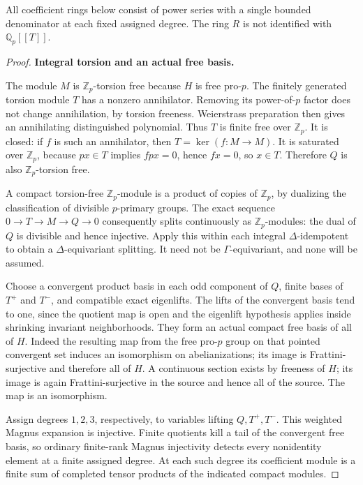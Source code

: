 \documentclass[11pt,a4paper]{article}
\theoremstyle{definition}
\begin{document}
All coefficient rings below consist of power series with a single bounded denominator at each fixed assigned degree. The ring \(R\) is not identified with \(\mathbb Q_p[[T]]\).

\begin{proof}
\par\medskip\noindent\textbf{Integral torsion and an actual free basis.}

The module \(M\) is \(\mathbb Z_p\)-torsion free because \(H\) is free pro-\(p\). The finitely generated torsion module \(T\) has a nonzero annihilator. Removing its power-of-\(p\) factor does not change annihilation, by torsion freeness. Weierstrass preparation then gives an annihilating distinguished polynomial. Thus \(T\) is finite free over \(\mathbb Z_p\). It is closed: if \(f\) is such an annihilator, then \(T=\ker(f:M\to M)\). It is saturated over \(\mathbb Z_p\), because \(p x\in T\) implies \(fpx=0\), hence \(fx=0\), so \(x\in T\). Therefore \(Q\) is also \(\mathbb Z_p\)-torsion free.

A compact torsion-free \(\mathbb Z_p\)-module is a product of copies of \(\mathbb Z_p\), by dualizing the classification of divisible \(p\)-primary groups. The exact sequence \(0\to T\to M\to Q\to0\) consequently splits continuously as \(\mathbb Z_p\)-modules: the dual of \(Q\) is divisible and hence injective. Apply this within each integral \(\Delta\)-idempotent to obtain a \(\Delta\)-equivariant splitting. It need not be \(\Gamma\)-equivariant, and none will be assumed.

Choose a convergent product basis in each odd component of \(Q\), finite bases of \(T^+\) and \(T^-\), and compatible exact eigenlifts. The lifts of the convergent basis tend to one, since the quotient map is open and the eigenlift hypothesis applies inside shrinking invariant neighborhoods. They form an actual compact free basis of all of \(H\). Indeed the resulting map from the free pro-\(p\) group on that pointed convergent set induces an isomorphism on abelianizations; its image is Frattini-surjective and therefore all of \(H\). A continuous section exists by freeness of \(H\); its image is again Frattini-surjective in the source and hence all of the source. The map is an isomorphism.

Assign degrees \(1,2,3\), respectively, to variables lifting \(Q,T^+,T^-\). This weighted Magnus expansion is injective. Finite quotients kill a tail of the convergent free basis, so ordinary finite-rank Magnus injectivity detects every nonidentity element at a finite assigned degree. At each such degree its coefficient module is a finite sum of completed tensor products of the indicated compact modules.


\end{proof}
\end{document}
